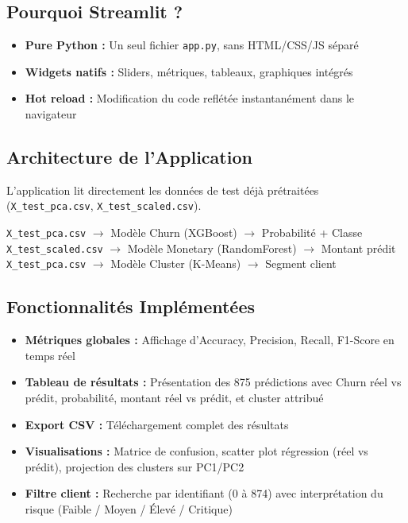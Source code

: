 \documentclass[11pt,a4paper]{article}
\begin{document}
\subsection{Pourquoi Streamlit ?}

\begin{itemize}[label=\color{headerblue}$\bullet$]
    \item \textbf{Pure Python :} Un seul fichier \texttt{app.py}, sans HTML/CSS/JS séparé
    \item \textbf{Widgets natifs :} Sliders, métriques, tableaux, graphiques intégrés
    \item \textbf{Hot reload :} Modification du code reflétée instantanément dans le navigateur
\end{itemize}

\subsection{Architecture de l'Application}

L'application lit directement les données de test déjà prétraitées (\texttt{X\_test\_pca.csv}, \texttt{X\_test\_scaled.csv}).

\begin{tcolorbox}[colframe=headerblue, title=Flux de l'inférence]
\texttt{X\_test\_pca.csv} $\rightarrow$ Modèle Churn (XGBoost) $\rightarrow$ Probabilité + Classe \\
\texttt{X\_test\_scaled.csv} $\rightarrow$ Modèle Monetary (RandomForest) $\rightarrow$ Montant prédit \\
\texttt{X\_test\_pca.csv} $\rightarrow$ Modèle Cluster (K-Means) $\rightarrow$ Segment client
\end{tcolorbox}

\subsection{Fonctionnalités Implémentées}

\begin{itemize}[label=\color{successgreen}$\checkmark$]
    \item \textbf{Métriques globales :} Affichage d'Accuracy, Precision, Recall, F1-Score en temps réel
    \item \textbf{Tableau de résultats :} Présentation des 875 prédictions avec Churn réel vs prédit, probabilité, montant réel vs prédit, et cluster attribué
    \item \textbf{Export CSV :} Téléchargement complet des résultats
    \item \textbf{Visualisations :} Matrice de confusion, scatter plot régression (réel vs prédit), projection des clusters sur PC1/PC2
    \item \textbf{Filtre client :} Recherche par identifiant (0 à 874) avec interprétation du risque (Faible / Moyen / Élevé / Critique)
\end{itemize}
\end{document}
